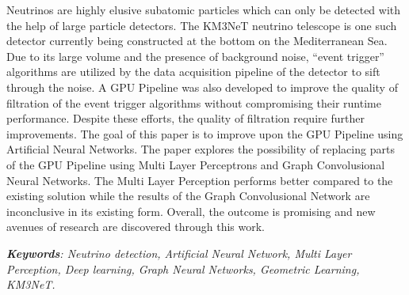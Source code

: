


\begin{abstracts}        %

  Neutrinos are highly elusive subatomic particles which can only be
  detected with the help of large particle detectors. The KM3NeT
  neutrino telescope is one such detector currently being constructed
  at the bottom on the Mediterranean Sea. Due to its large volume and
  the presence of background noise, ``event trigger'' algorithms are
  utilized by the data acquisition pipeline of the detector to sift
  through the noise. A GPU Pipeline was also developed to improve the
  quality of filtration of the event trigger algorithms without
  compromising their runtime performance. Despite these efforts, the
  quality of filtration require further improvements. The goal of this
  paper is to improve upon the GPU Pipeline using Artificial Neural
  Networks. The paper explores the possibility of replacing parts of
  the GPU Pipeline using Multi Layer Perceptrons and Graph
  Convolusional Neural Networks. The Multi Layer Perception performs
  better compared to the existing solution while the results of the
  Graph Convolusional Network are inconclusive in its existing form.
  Overall, the outcome is promising and new avenues of research are
  discovered through this work.

  \emph{\textbf{Keywords}: Neutrino detection, Artificial Neural
  Network, Multi Layer Perception, Deep learning, Graph Neural
  Networks, Geometric Learning, KM3NeT.}
\end{abstracts}


